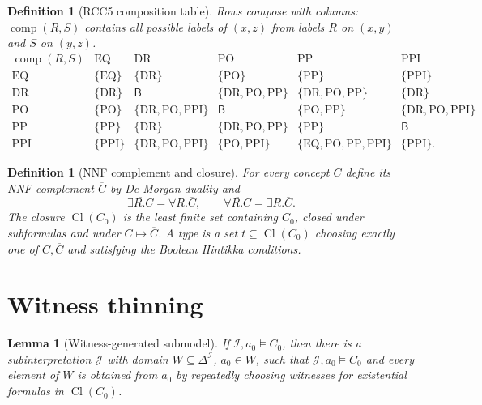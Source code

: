 \documentclass[11pt]{article}
\newtheorem{lemma}[theorem]{Lemma}
\newtheorem{definition}[theorem]{Definition}
\newcommand{\Cl}{\operatorname{Cl}}
\newcommand{\comp}{\operatorname{comp}}
\newcommand{\PP}{\mathrm{PP}}
\newcommand{\PPI}{\mathrm{PPI}}
\newcommand{\DR}{\mathrm{DR}}
\newcommand{\PO}{\mathrm{PO}}
\newcommand{\EQ}{\mathrm{EQ}}
\newcommand{\B}{\mathsf B}
\newcommand{\I}{\mathcal I}
\newcommand{\J}{\mathcal J}
\begin{document}
\begin{definition}[RCC5 composition table]
Rows compose with columns: $\comp(R,S)$ contains all possible labels of $(x,z)$ from labels $R$ on $(x,y)$ and $S$ on $(y,z)$.
\[
\begin{array}{c|ccccc}
\comp(R,S)&\EQ&\DR&\PO&\PP&\PPI\\\hline
\EQ&\{\EQ\}&\{\DR\}&\{\PO\}&\{\PP\}&\{\PPI\}\\
\DR&\{\DR\}&\B&\{\DR,\PO,\PP\}&\{\DR,\PO,\PP\}&\{\DR\}\\
\PO&\{\PO\}&\{\DR,\PO,\PPI\}&\B&\{\PO,\PP\}&\{\DR,\PO,\PPI\}\\
\PP&\{\PP\}&\{\DR\}&\{\DR,\PO,\PP\}&\{\PP\}&\B\\
\PPI&\{\PPI\}&\{\DR,\PO,\PPI\}&\{\PO,\PPI\}&\{\EQ,\PO,\PP,\PPI\}&\{\PPI\}.
\end{array}
\]
\end{definition}

\begin{definition}[NNF complement and closure]
For every concept $C$ define its NNF complement $\overline C$ by De Morgan duality and
\[
 \overline{\exists R.C}=\forall R.\overline C,
 \qquad
 \overline{\forall R.C}=\exists R.\overline C.
\]
The closure $\Cl(C_0)$ is the least finite set containing $C_0$, closed under subformulas and under $C\mapsto\overline C$.  A type is a set $t\subseteq\Cl(C_0)$ choosing exactly one of $C,\overline C$ and satisfying the Boolean Hintikka conditions.
\end{definition}

\section{Witness thinning}

\begin{lemma}[Witness-generated submodel]
\label{lem:thinning}
If $\I,a_0\models C_0$, then there is a subinterpretation $\J$ with domain $W\subseteq\Delta^\I$, $a_0\in W$, such that $\J,a_0\models C_0$ and every element of $W$ is obtained from $a_0$ by repeatedly choosing witnesses for existential formulas in $\Cl(C_0)$.
\end{lemma}
\end{document}
